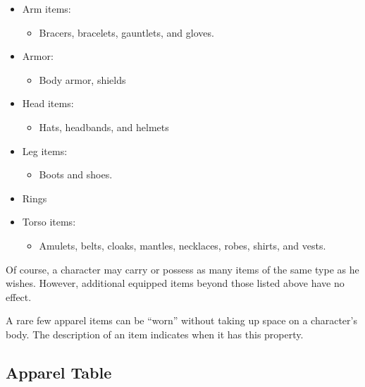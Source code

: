         \begin{itemize}
            \item Arm items:
                \begin{itemize}
                    \item Bracers, bracelets, gauntlets, and gloves.
                \end{itemize}
            \item Armor:
                \begin{itemize}
                    \item Body armor, shields
                \end{itemize}
            \item Head items:
                \begin{itemize}
                    \item Hats, headbands, and helmets
                \end{itemize}
            \item Leg items:
                \begin{itemize}
                    \item Boots and shoes.
                \end{itemize}
            \item Rings
            \item Torso items:
                \begin{itemize}
                    \item Amulets, belts, cloaks, mantles, necklaces, robes, shirts, and vests.
                \end{itemize}
        \end{itemize}

        Of course, a character may carry or possess as many items of the same type as he wishes.
        However, additional equipped items beyond those listed above have no effect.

        A rare few apparel items can be ``worn'' without taking up space on a character's body.
        The description of an item indicates when it has this property.

        \onecolumn

    \subsection{Apparel Table}

